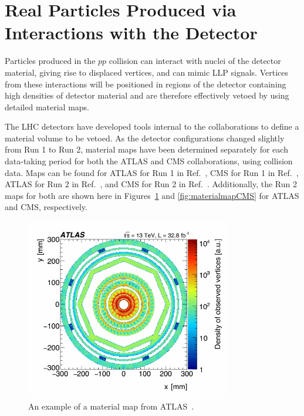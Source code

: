 \section{Real Particles Produced via Interactions with the Detector}

Particles produced in the $pp$ collision can interact with nuclei of the detector material, giving rise to displaced vertices, and can mimic LLP signals. Vertices from these interactions will be positioned in regions of the detector containing high densities of detector material and are therefore effectively vetoed by using detailed material maps.

The LHC detectors have developed tools internal to the collaborations to define a material volume to be vetoed. As the detector configurations changed slightly from Run 1 to Run 2, material maps have been determined separately for each data-taking period for both the ATLAS and CMS collaborations, using collision data. Maps can be found for ATLAS for Run 1 in Ref.~\cite{Aaboud:2016poq}, CMS for Run 1 in Ref.~\cite{CMS:2010nua}, ATLAS for Run 2 in Ref.~\cite{Aaboud:2017iio}, and CMS for Run 2 in Ref.~\cite{Sirunyan:2018icq}. Additionally, the Run 2 maps for both are shown here in Figures~\ref{fig:materialmapATLAS} and \ref{fig:materialmapCMS} for ATLAS and CMS, respectively.
%
\begin{figure}[t]
  \centering
  \includegraphics[width=0.8\textwidth]{figures/atlasmaterial.pdf}
  \caption{An example of a material map from ATLAS~\cite{Aaboud:2017iio}.
  }
  \label{fig:materialmapATLAS}
\end{figure}

